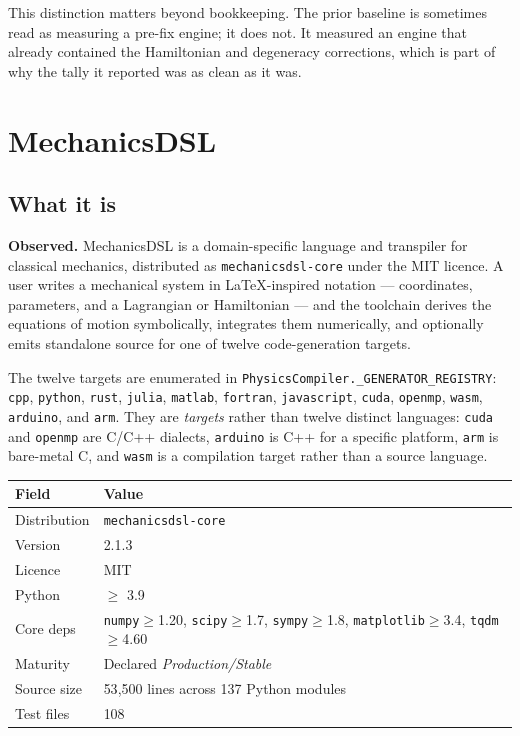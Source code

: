 \documentclass[11pt,a4paper]{article}
\begin{document}
This distinction matters beyond bookkeeping. The prior baseline is sometimes
read as measuring a pre-fix engine; it does not. It measured an engine that
already contained the Hamiltonian and degeneracy corrections, which is part of
why the tally it reported was as clean as it was.

\section{MechanicsDSL}\label{sec:engine}

\subsection{What it is}

\noindent\textbf{Observed.} MechanicsDSL is a domain-specific language and
transpiler for classical mechanics, distributed as \texttt{mechanicsdsl-core}
under the MIT licence. A user writes a mechanical system in LaTeX-inspired
notation --- coordinates, parameters, and a Lagrangian or Hamiltonian --- and
the toolchain derives the equations of motion symbolically, integrates them
numerically, and optionally emits standalone source for one of twelve
code-generation targets.

\noindent The twelve targets are enumerated in
\texttt{PhysicsCompiler.\_GENERATOR\_REGISTRY}: \texttt{cpp}, \texttt{python},
\texttt{rust}, \texttt{julia}, \texttt{matlab}, \texttt{fortran},
\texttt{javascript}, \texttt{cuda}, \texttt{openmp}, \texttt{wasm},
\texttt{arduino}, and \texttt{arm}. They are \emph{targets} rather than twelve
distinct languages: \texttt{cuda} and \texttt{openmp} are C/C++ dialects,
\texttt{arduino} is C++ for a specific platform, \texttt{arm} is bare-metal C,
and \texttt{wasm} is a compilation target rather than a source language.

\begin{center}
\begin{tabular}{@{}lL{0.55\textwidth}@{}}
\toprule
\textbf{Field} & \textbf{Value} \\
\midrule
Distribution   & \texttt{mechanicsdsl-core} \\
Version        & 2.1.3 \\
Licence        & MIT \\
Python         & $\geq$ 3.9 \\
Core deps      & \texttt{numpy}$\geq$1.20, \texttt{scipy}$\geq$1.7, \texttt{sympy}$\geq$1.8, \texttt{matplotlib}$\geq$3.4, \texttt{tqdm}$\geq$4.60 \\
Maturity       & Declared \emph{Production/Stable} \\
Source size    & 53{,}500 lines across 137 Python modules \\
Test files     & 108 \\
\bottomrule
\end{tabular}
\end{center}
\end{document}

